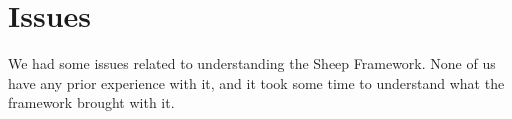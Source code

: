 \section{Issues}
\label{sec:issues} 
We had some issues related to understanding the Sheep Framework. None of us
have any prior experience with it, and it took some time to understand what the
framework brought with it. 